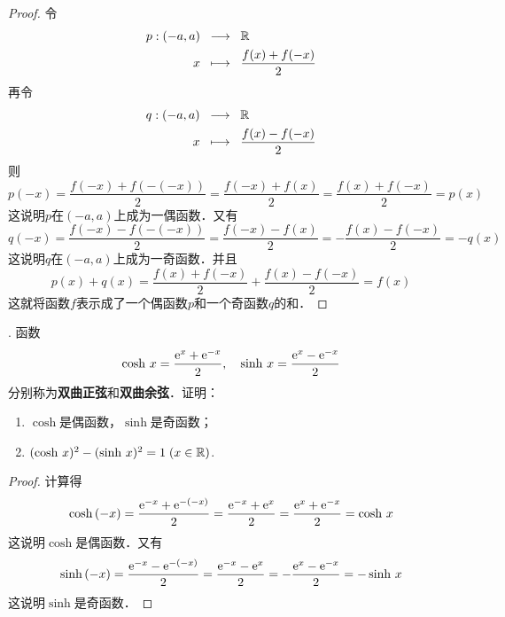 \begin{proof}
令
\begin{align}
    p: (-a, a) \;\; &\longrightarrow \;\; \mathbb{R} \\
    x \;\; &\longmapsto \;\; \displaystyle\frac{f(x)+f(-x)}{2}
\end{align}
再令
\begin{align}
    q: (-a, a) \;\; &\longrightarrow \;\; \mathbb{R} \\
    x \;\; &\longmapsto \;\; \displaystyle\frac{f(x)-f(-x)}{2}
\end{align}
则
\begin{equation}
    p(-x) = \displaystyle\frac{f(-x)+f(-(-x))}{2} = \displaystyle\frac{f(-x)+f(x)}{2} = \displaystyle\frac{f(x)+f(-x)}{2} = p(x)
\end{equation}
这说明$p$在$(-a, a)$上成为一偶函数．又有
\begin{equation}
    q(-x) = \displaystyle\frac{f(-x)-f(-(-x))}{2} = \displaystyle\frac{f(-x)-f(x)}{2} = -\displaystyle\frac{f(x)-f(-x)}{2} = -q(x)
\end{equation}
这说明$q$在$(-a, a)$上成为一奇函数．并且
\begin{equation}
    p(x)+q(x) = \displaystyle\frac{f(x)+f(-x)}{2} + \displaystyle\frac{f(x)-f(-x)}{2} = f(x)
\end{equation}
这就将函数$f$表示成了一个偶函数$p$和一个奇函数$q$的和．
\end{proof}

. 函数
\begin{equation}
    \cosh \, x = \frac{\mathrm{e}^x + \mathrm{e}^{-x}}{2}, \quad \sinh \, x = \frac{\mathrm{e}^{x} - \mathrm{e}^{-x}}{2}
\end{equation}
分别称为{\bfseries{双曲正弦}}和{\bfseries{双曲余弦}}．证明：
\begin{enumerate}
    \item $\cosh$是偶函数，$\sinh$是奇函数；
    \item $(\cosh \, x)^2 - (\sinh \, x)^2 = 1 \; (x \in \mathbb{R})$.
\end{enumerate}

\begin{proof}
计算得
\begin{equation}
    \cosh \, (-x) = \frac{\mathrm{e}^{-x} + \mathrm{e}^{-(-x)}}{2} = \frac{\mathrm{e}^{-x}+\mathrm{e}^{x}}{2} = \frac{\mathrm{e}^x + \mathrm{e}^{-x}}{2} = \cosh \, x
\end{equation}
这说明$\cosh$是偶函数．又有
\begin{equation}
    \sinh \, (-x) = \frac{\mathrm{e}^{-x} - \mathrm{e}^{-(-x)}}{2} = \frac{\mathrm{e}^{-x}-\mathrm{e}^{x}}{2} = - \frac{\mathrm{e}^{x} - \mathrm{e}^{-x}}{2} = - \sinh \, x
\end{equation}
这说明$\sinh$是奇函数．
\end{proof}

